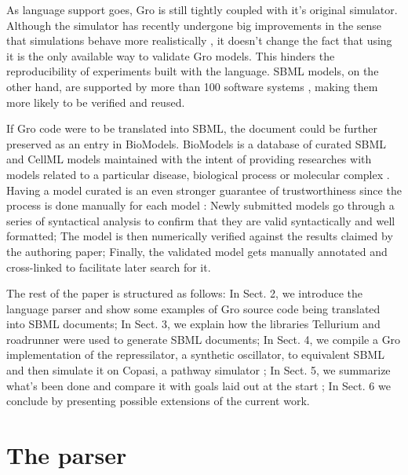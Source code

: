 \documentclass[12pt]{article}
\begin{document}
    As language support goes, Gro is still tightly coupled with it's original simulator. Although the simulator has recently undergone big improvements in the sense that simulations behave more realistically \cite{Gutirrez2017}, it doesn't change the fact that using it is the only available way to validate Gro models. This hinders the reproducibility of experiments built with the language. SBML models, on the other hand, are supported by more than 100 software systems \cite{Hucka2007}, making them more likely to be verified and reused.
    
    If Gro code were to be translated into SBML, the document could be further preserved as an entry in BioModels. BioModels is a database of curated SBML and CellML models maintained with the intent of providing researches with models related to a particular disease, biological process or molecular complex \cite{LeNovere2006}. Having a model curated is an even stronger guarantee of trustworthiness since the process is done manually for each model \cite{LeNovere2006}: Newly submitted models go through a series of syntactical analysis to confirm that they are valid syntactically and well formatted; The model is then numerically verified against the results claimed by the authoring paper; Finally, the validated model gets manually annotated and cross-linked to facilitate later search for it.

    The rest of the paper is structured as follows: In Sect. 2, we introduce the language parser and show some examples of Gro source code being translated into SBML documents; In Sect. 3, we explain how the libraries Tellurium and roadrunner were used to generate SBML documents; In Sect. 4, we compile a Gro implementation of the repressilator, a synthetic oscillator, to equivalent SBML and then simulate it on Copasi, a pathway simulator \cite{Hoops2006}; In Sect. 5, we summarize what's been done and compare it with goals laid out at the start ; In Sect. 6 we conclude by presenting possible extensions of the current work.
    
    
\section{The parser}
    \lipsum[1]
    
\end{document}
